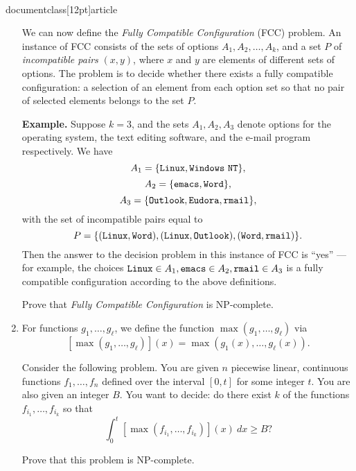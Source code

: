 \\documentclass[12pt]{article}
\begin{document}
\begin{enumerate}
We can now define the {\em Fully Compatible Configuration} (FCC) problem.
An instance of FCC consists of the sets of options
$A_1, A_2, \ldots, A_k$, and a set $P$ of
{\em incompatible pairs} $(x,y)$, where $x$ and $y$
are elements of different sets of options.
The problem is to decide whether there exists a fully
compatible configuration:
a selection of an element from each option set
so that no pair of selected elements belongs to the set $P$.

\def\Linux{{\tt Linux}}
\def\WindowsNT{{\tt Windows~NT}}
\def\emacs{{\tt emacs}}
\def\Word{{\tt Word}}
\def\Outlook{{\tt Outlook}}
\def\Eudora{{\tt Eudora}}
\def\rmail{{\tt rmail}}

\bigskip
{\bf Example.}  Suppose $k = 3$, and the sets $A_1, A_2, A_3$
denote options for
the operating system, the text editing software, and
the e-mail program respectively.
We have
$$A_1 = \{\Linux, \WindowsNT\},$$
$$A_2 = \{\emacs, \Word\},$$
$$A_3 = \{\Outlook, \Eudora, \rmail\},$$
with the set of incompatible pairs equal to
$$P = \{(\Linux,\Word), (\Linux,\Outlook), (\Word,\rmail)\}.$$
Then the answer to the decision problem in this instance
of FCC is ``yes'' --- for example, the choices
$\Linux \in A_1, \emacs \in A_2, \rmail \in A_3$
is a fully compatible configuration according to the above definitions.

Prove that {\em Fully Compatible Configuration} is NP-complete.


\item 

For functions $g_1, \ldots, g_\ell$, we define
the function $\max(g_1, \ldots, g_\ell)$ via
$$[\max(g_1, \ldots, g_\ell)](x) = \max(g_1(x), \ldots, g_\ell(x)).$$

Consider the following problem.
You are given $n$ piecewise linear, continuous functions
$f_1, \ldots, f_n$ defined over the
interval $[0,t]$ for some integer $t$.
You are also given an integer $B$.
You want to decide: do there exist
$k$ of the functions $f_{i_1}, \ldots, f_{i_k}$
so that
$$\int_0^t [\max(f_{i_1}, \ldots, f_{i_k})](x) ~ dx \geq B ?$$

Prove that this problem is NP-complete.

\end{enumerate}
\end{document}

